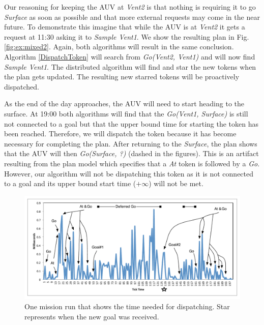 Our reasoning for keeping the AUV at {\em Vent2} is that
nothing is requiring it to go {\em Surface} as soon as possible and that
more external requests may come in the near future. To demonstrate
this imagine that while the AUV is at {\em Vent2} it gets a
request at 11:30 asking it to {\em Sample Vent1}.  We show the resulting plan in
Fig. \ref{fig:ex:mixed2}. Again, both algorithms will result in the
same conclusion. Algorithm \ref{DispatchToken} will search from {\em
Go(Vent2, Vent1)} and will now find {\em Sample Vent1}. The
distributed algorithm will find and star the new tokens when the plan
gets updated. The resulting new starred tokens will be proactively
dispatched.

As the end of the day approaches, the AUV will need to start heading
to the surface. At 19:00 both algorithms will find that the {\em Go(Vent1,
Surface)} is still not connected to a goal but that the upper bound time
for starting the token has been reached. Therefore, we will dispatch
the token because it has become necessary for completing the plan.
After returning to the {\em Surface}, the plan shows that the AUV will then {\em
Go(Surface, ?)} (dashed in the figures). This is an artifact resulting
from the plan model which specifies that a {\em At} token is followed by a {\em Go}. 
However, our algorithm will not be dispatching this token as 
it is not connected to a goal and its upper bound start time
($+\infty$) will not be met.

\begin{figure}
\centering
\includegraphics[width=\columnwidth]{figs/example_run.pdf}
\caption{\small  One mission run that shows the time needed for dispatching. Star represents when the new goal was
received. } 
  \label{fig:example_run}
\end{figure}

